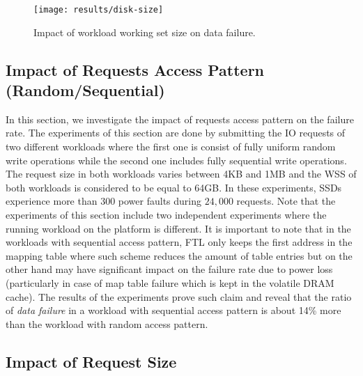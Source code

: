 \begin{figure}[t]
	\centering
	\texttt{[image: results/disk-size]}
	\vspace{-0.5em}
	\caption{Impact of workload working set size on data failure.}
	\vspace{-2em}
	\label{disk_size}
\end{figure}

\vspace{-1em}
\subsection{Impact of Requests Access Pattern (Random/Sequential)}
\vspace{-0.7em}
\label{sec:pattern}
In this section, we investigate the impact of requests access pattern on the failure rate. The experiments of this section are done by submitting the IO requests of two different workloads where the first one is consist of fully uniform random write operations while the second one includes fully sequential write operations. The request size in both workloads varies between 4KB and 1MB and the WSS of both workloads is considered to be equal to 64GB.
In these experiments, SSDs experience more than 300 power faults during $24,000$ requests. Note that the experiments of this section include two independent experiments where the running workload on the platform is different.
It is important to note that in the workloads with sequential access pattern, FTL only keeps the first address in the mapping table where such scheme reduces the amount of table entries but on the other hand may have significant impact on the failure rate due to power loss (particularly in case of map table failure which is kept in the volatile DRAM cache). The results of the experiments prove such claim and reveal that the ratio of \emph{data failure} in a workload with sequential access pattern is about 14\% more than the workload with random access pattern. 

\vspace{-1em}
\subsection{Impact of Request Size}
\vspace{-0.7em}
\label{sec:req_size}

